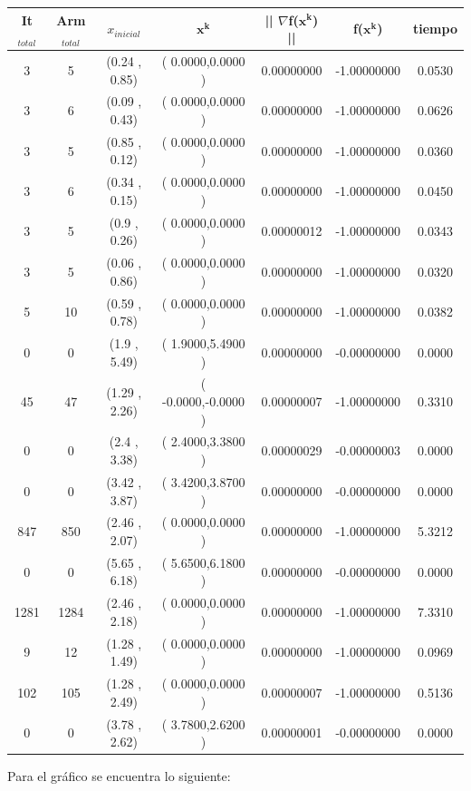 \begin{itemize}
\begin{table}[H]
\centering
\renewcommand{\arraystretch}{1.2}
\begin{tabular}{|c|c|c|c|c|c|c|}
\hline
\textbf{It$_{total}$} & \textbf{Arm$_{total}$} & \textbf{$x_{inicial}$} & \textbf{$\mathbf{x^k}$} & \textbf{|| $\nabla$f($\mathbf{x^k}$) ||} & \textbf{f($\mathbf{x^k}$)} & \textbf{tiempo} \\
\hline
3  & 5 &  (0.24 , 0.85) &( 0.0000,0.0000 ) & 0.00000000 & -1.00000000 & 0.0530 \\
3  & 6 &  (0.09 , 0.43) &( 0.0000,0.0000 ) & 0.00000000 & -1.00000000 & 0.0626 \\
3  & 5 &  (0.85 , 0.12) &( 0.0000,0.0000 ) & 0.00000000 & -1.00000000 & 0.0360 \\
3  & 6 &  (0.34 , 0.15) &( 0.0000,0.0000 ) & 0.00000000 & -1.00000000 & 0.0450 \\
3  & 5 &  (0.9 , 0.26) &( 0.0000,0.0000 ) & 0.00000012 & -1.00000000 & 0.0343 \\
3  & 5 &  (0.06 , 0.86) &( 0.0000,0.0000 ) & 0.00000000 & -1.00000000 & 0.0320 \\
5  & 10 &  (0.59 , 0.78) &( 0.0000,0.0000 ) & 0.00000000 & -1.00000000 & 0.0382 \\
0  & 0 &  (1.9 , 5.49) &( 1.9000,5.4900 ) & 0.00000000 & -0.00000000 & 0.0000 \\
45  & 47 &  (1.29 , 2.26) &( -0.0000,-0.0000 ) & 0.00000007 & -1.00000000 & 0.3310 \\
0  & 0 &  (2.4 , 3.38) &( 2.4000,3.3800 ) & 0.00000029 & -0.00000003 & 0.0000 \\
0  & 0 &  (3.42 , 3.87) &( 3.4200,3.8700 ) & 0.00000000 & -0.00000000 & 0.0000 \\
847  & 850 &  (2.46 , 2.07) &( 0.0000,0.0000 ) & 0.00000000 & -1.00000000 & 5.3212 \\
0  & 0 &  (5.65 , 6.18) &( 5.6500,6.1800 ) & 0.00000000 & -0.00000000 & 0.0000 \\
1281  & 1284 &  (2.46 , 2.18) &( 0.0000,0.0000 ) & 0.00000000 & -1.00000000 & 7.3310 \\
9  & 12 &  (1.28 , 1.49) &( 0.0000,0.0000 ) & 0.00000000 & -1.00000000 & 0.0969 \\
102  & 105 &  (1.28 , 2.49) &( 0.0000,0.0000 ) & 0.00000007 & -1.00000000 & 0.5136 \\
0  & 0 &  (3.78 , 2.62) &( 3.7800,2.6200 ) & 0.00000001 & -0.00000000 & 0.0000 \\
\hline
\end{tabular}
\end{table}
Para el gráfico se encuentra lo siguiente:


\end{itemize}

